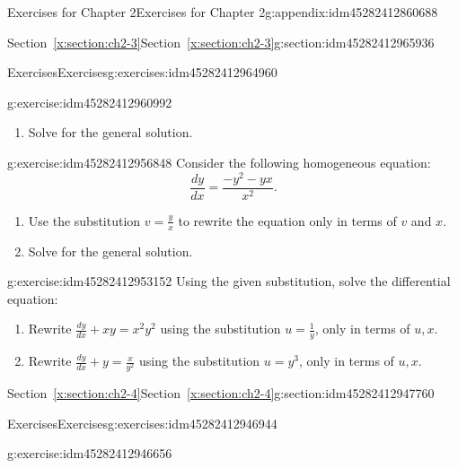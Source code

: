 \documentclass[oneside,10pt,]{book}
\numberwithin{equation}{section}
\numberwithin{equation}{section}
\begin{document}
\begin{appendixptx}{Exercises for Chapter 2}{}{Exercises for Chapter 2}{}{}{g:appendix:idm45282412860688}
\begin{sectionptx}{Section~\ref*{x:section:ch2-3}}{}{Section~\ref*{x:section:ch2-3}}{}{}{g:section:idm45282412965936}
\begin{exercises-subsection-numberless}{Exercises}{}{Exercises}{}{}{g:exercises:idm45282412964960}
\begin{divisionexercise}{2}{}{}{g:exercise:idm45282412960992}
\begin{enumerate}[label=(\alph*)]
\item{}Solve for the general solution.%
\end{enumerate}
%
\end{divisionexercise}%
\begin{divisionexercise}{3}{}{}{g:exercise:idm45282412956848}%
Consider the following homogeneous equation:%
\begin{equation*}
\frac{dy}{dx}=\frac{-y^{2}-yx}{x^{2}}.
\end{equation*}
%
\begin{enumerate}[label=(\alph*)]
\item{}Use the substitution \(v=\frac{y}{x}\) to rewrite the equation only in terms of \(v\) and \(x\).%
\item{}Solve for the general solution.%
\end{enumerate}
\end{divisionexercise}%
\begin{divisionexercise}{4}{}{}{g:exercise:idm45282412953152}%
Using the given substitution, solve the differential equation:%
%
\begin{enumerate}[label=(\alph*)]
\item{}Rewrite \({\displaystyle \frac{dy}{dx}+xy=x^{2}y^{2}}\) using the substitution \(u=\frac{1}{y}\), only in terms of \(u,x\).%
\item{}Rewrite \({\displaystyle \frac{dy}{dx}+y=\frac{x}{y^{2}}}\) using the substitution \(u=y^{3}\), only in terms of \(u,x\).%
\end{enumerate}
\end{divisionexercise}%
\end{exercises-subsection-numberless}
\end{sectionptx}
%
%
\typeout{************************************************}
\typeout{************************************************}
%
\begin{sectionptx}{Section~\ref*{x:section:ch2-4}}{}{Section~\ref*{x:section:ch2-4}}{}{}{g:section:idm45282412947760}
%
%
\typeout{************************************************}
\typeout{************************************************}
%
\begin{exercises-subsection-numberless}{Exercises}{}{Exercises}{}{}{g:exercises:idm45282412946944}
\begin{divisionexercise}{1}{}{}{g:exercise:idm45282412946656}%

\end{divisionexercise}
\end{exercises-subsection-numberless}
\end{sectionptx}
\end{appendixptx}
\end{document}
